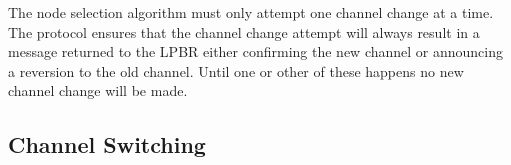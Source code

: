 The node selection algorithm must only attempt one channel change at a time.  The protocol ensures that the
channel change attempt will always result in a message returned to the LPBR either confirming the new channel
or announcing a reversion to the old channel.  Until one or other of these happens no new channel change will
be made.







\subsection{Channel Switching}
\label{sec:channelswitch}


